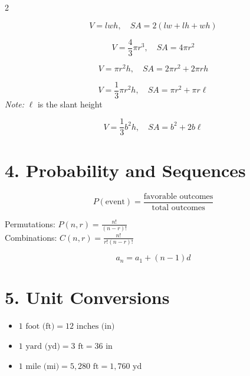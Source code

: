 \documentclass[12pt]{article}
\begin{document}
\begin{multicols}{2}
\begin{tcolorbox}[title=Rectangular Prism]
\[
V = lwh, \quad SA = 2(lw + lh + wh)
\]
\end{tcolorbox}

\begin{tcolorbox}[title=Sphere]
\[
V = \frac{4}{3}\pi r^3, \quad SA = 4\pi r^2
\]
\end{tcolorbox}

\begin{tcolorbox}[title=Cylinder]
\[
V = \pi r^2 h, \quad SA = 2\pi r^2 + 2\pi rh
\]
\end{tcolorbox}

\begin{tcolorbox}[title=Cone]
\[
V = \frac{1}{3}\pi r^2 h, \quad SA = \pi r^2 + \pi r\ell
\]
\textit{Note: } \( \ell \) is the slant height
\end{tcolorbox}

\begin{tcolorbox}[title=Square Pyramid]
\[
V = \frac{1}{3}b^2 h, \quad SA = b^2 + 2b\ell
\]
\end{tcolorbox}



\section*{4. Probability and Sequences}

\begin{tcolorbox}[title=Probability]
\[
P(\text{event}) = \frac{\text{favorable outcomes}}{\text{total outcomes}}
\]
\end{tcolorbox}

\begin{tcolorbox}[title=Permutations and Combinations]
Permutations: \( P(n, r) = \frac{n!}{(n - r)!} \)\\
Combinations: \( C(n, r) = \frac{n!}{r!(n - r)!} \)
\end{tcolorbox}

\begin{tcolorbox}[title=Arithmetic Sequence]
\[
a_n = a_1 + (n - 1)d
\]
\end{tcolorbox}

\section*{5. Unit Conversions}

\begin{tcolorbox}[title=Length (U.S. Customary)]
\begin{itemize}[left=0pt]
  \item \( 1 \text{ foot (ft)} = 12 \text{ inches (in)} \)
  \item \( 1 \text{ yard (yd)} = 3 \text{ ft} = 36 \text{ in} \)
  \item \( 1 \text{ mile (mi)} = 5,280 \text{ ft} = 1,760 \text{ yd} \)
\end{itemize}
\end{tcolorbox}


\end{multicols}
\end{document}

